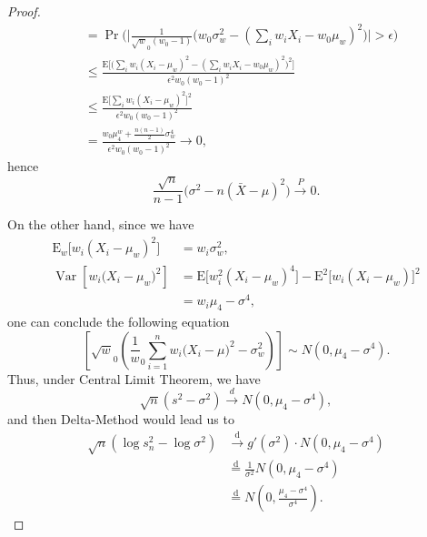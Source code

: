 \documentclass[12pt]{article}
\begin{document}
\begin{proof}
\begin{equation*}
\begin{split}
        & = \Pr\Bigg(\Bigg|\frac {1}{\sqrt w_0(w_0-1)}\Big(w_0 \sigma_w^2 -  ( \sum_i w_i X_i - w_0 \mu_w)^2 \Big)\Bigg| > \epsilon \Bigg) \\
        & \leq \frac{\mathrm{E}\bigg[ \bigg( \sum_i w_i (X_i - \mu_w)^2 - ( \sum_i w_i X_i - w_0 \mu_w)^2 \bigg)^2 \bigg]}{\epsilon^2 w_0 (w_0 - 1)^2} \\
        & \leq \frac{\mathrm{E}\bigg[ \sum_i w_i (X_i - \mu_w)^2 \bigg]^2 }{\epsilon^2 w_0 (w_0-1)^2} \\
        & = \frac{w_0 \mu_4^w + \frac{n(n-1)}{2} \sigma_w^4}{{\epsilon^2 w_0 (w_0-1)^2}} \rightarrow 0,
    \end{split}
\end{equation*}
hence 
\begin{equation*}
    \frac {\sqrt n}{n-1}\Big(\sigma^2 -  n (\bar X -\mu)^2 \Big) \xrightarrow{P} 0.
\end{equation*}

\noindent On the other hand, since we have
\begin{equation*}
    \begin{split}
        \mathrm{E}_w \Big[w_i(X_i-\mu_w)^2 \Big] & = w_i \sigma_w^2,\\
        \operatorname {Var}\left[ w_i \Big(X_i-\mu_w \Big)^2\right] & = \mathrm{E} \Big[ w_i^2 (X_i-\mu_w)^4 \Big] -  \mathrm{E} ^2 \Big[ w_i (X_i-\mu_w) \Big]^2 \\ 
        & = w_i \mu_4 - \sigma^4,
    \end{split}
\end{equation*}
one can conclude the following equation
\begin{equation*}
    \left[\sqrt w_0 \left(\frac 1 w_0 \sum_{i=1}^n w_i \Big(X_i-\mu\Big)^2 -\sigma_w^2\right)\right] \sim  N\left(0,\mu_4 - \sigma^4\right).
\end{equation*}
Thus, under Central Limit Theorem, we have
\begin{equation}
    \sqrt n(s^2 - \sigma^2) \xrightarrow{d} N\left(0,\mu_4 - \sigma^4\right), 
\end{equation}
and then Delta-Method \cite{Larry2020all} would lead us to 
\begin{equation*}
    \begin{split}
        \sqrt{n}(\log s_n^2 - \log \sigma^2) & \xrightarrow{\text{d}} g \prime (\sigma^2) \cdot N\left(0,\mu_4 - \sigma^4\right) \\
        & \stackrel{\text{d}}{=} \frac{1}{\sigma^2} N(0,\mu_4 - \sigma^4) \\
        & \stackrel{\text{d}}{=} N(0, \frac{\mu_4 - \sigma^4}{\sigma^4}).
    \end{split}
\end{equation*}
\end{proof}

\printbibliography
\end{document}
